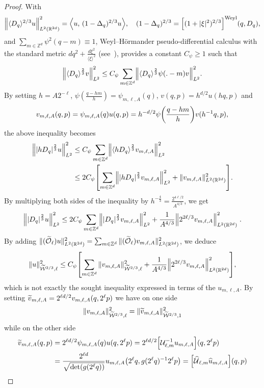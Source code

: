 \documentclass[AHL,Unicode,longabstracts]{cedram}
\newcommand{\Z}{\mathbb{Z}}
\newcommand{\R}{\mathbb{R}}
\newcommand{\clW}{\mathcal{W}}
\newcommand{\clO}{\mathcal{O}}
\newcommand{\clU}{\mathcal{U}}
\newcommand\norm[1]{\left\lVert#1\right\rVert}
\let\oldtilde\tilde
\renewcommand*{\tilde}[1]{\mathchoice{\widetilde{#1}}{\widetilde{#1}}{\oldtilde{#1}}{\oldtilde{#1}}}
\let\oldhat\hat
\renewcommand*{\hat}[1]{\mathchoice{\widehat{#1}}{\widehat{#1}}{\oldhat{#1}}{\oldhat{#1}}}
\let\originalleft\left
\let\originalright\right
\renewcommand{\left}{\mathopen{}\mathclose\bgroup\originalleft}
\renewcommand{\right}{\aftergroup\egroup\originalright}
\begin{document}
\begin{proof}
With
\[
\norm{\langle D_q\rangle^{2/3}u}_{L^2(\R^{2d})}^2=\left\langle u,\, (1-\Delta_q)^{2/3} u\right\rangle,\quad (1-\Delta_q)^{2/3}=\left[(1+|\xi|^2)^{2/3}\right]^{\text{Weyl}}(q,D_q),
\]
and $\sum_{m\in \Z^{d}} \psi^2(q-m)\equiv 1$, Weyl--H\"ormander pseudo-differential calculus with the standard metric $dq^2+\frac{d\xi^2}{\langle\xi\rangle^2}$ (see~\cite[Chapter~XVIII]{HormIII}), provides a constant $C_{\psi}\geq 1$ such that
\[
\left\| \langle D_q \rangle^{\frac{2}{3}} v \right\|_{L^2}^2 \leq C_{\psi}\sum_{m\in \Z^d}\left\| \langle D_q \rangle^{\frac{2}{3}} \psi(.-m) v \right\|_{L^2}^2 .
\]
By setting $h=A2^{-\ell}$, $\psi(\frac{q-hm}{h}) = \psi_{m,\ell,A }(q)$,
$v(q,p)=h^{d/2}u(hq,p)$ and
\[
v_{m,\ell,A}(q,p)=\psi_{m,\ell,A}(q)u(q,p)=h^{-d/2}\psi\left(\frac{q-hm}{h}\right)v(h^{-1}q,p),
\]
the above inequality becomes
\begin{align*}
\left\| |hD_q|^{\frac{2}{3}} u \right\|_{L^2}^2 &\leq C_{\psi}\sum_{m\in \Z^d}\left\| \langle hD_q \rangle^{\frac{2}{3}} v_{m,\ell,A}\right\|_{L^2}^2
\\
&\leq 2 C_{\psi}\left[\sum_{m\in \Z^d}\left\| |hD_q|^{\frac{2}{3}} v_{m,\ell,A} \right\|_{L^2}^2+\|v_{m,\ell, A}\|_{L^2(\R^{2d})}^2\right].
\end{align*}
By multiplying both sides of the inequality by $ h^{-\frac{4}{3}}=\frac{2^{4\ell/2}}{A^{4/3}}$, we get
\[
\left\| |D_q|^{\frac{2}{3}} u \right\|_{L^2}^2 \leq 2C_{\psi}\sum_{m\in \Z^d}\left\| |D_q|^{\frac{2}{3}} v_{m,\ell,A}\right\|_{L^2}^2 +\frac{1}{A^{4/3}}\left\|2^{2\ell/3}v_{m,\ell, A}\right\|_{L^2(\R^{2d})}^2\;.
\]
By adding $\|(\tilde{\clO}_{\ell})u\|_{L^2(\R^{2d})}^{2}=\sum_{m\in\Z^d} \|(\tilde{\clO}_{\ell})v_{m,\ell,A}\|_{L^2(\R^{2d})}^{2}$, we deduce
\[
\|u\|_{\widetilde{\clW}^{2/3},\ell}^2\leq C_{\psi}\left[\sum_{m\in\Z^d} \|v_{m,\ell,A}\|_{\widetilde{\clW}^{2/3},\ell}^2 +\frac{1}{A^{4/3}}\left\|2^{2\ell/3}v_{m,\ell, A}\right\|_{L^2(\R^{2d})}^2\right],
\]
which is not exactly the sought inequality expressed in terms of the $u_{m,\ell,A}$. By setting $\tilde{v}_{m,\ell,A}=2^{\ell d/2}v_{m,\ell,A}(q, 2^{\ell}p)$ we have on one side
\[
\|v_{m,\ell,A}\|_{\widetilde{\clW}^{2/3},\ell}^2= \|\tilde{v}_{m,\ell,A}\|_{\widetilde{\clW}^{2/3},1}^2
\]
while on the other side
\begin{align*}
\tilde{v}_{m,\ell, A}(q,p)&=2^{\ell d/2}\psi_{m,\ell,A}(q) u(q,2^{\ell}p)=2^{\ell d/2}\left[\clU_{\ell,m}^{-1}u_{m,\ell,A}\right](q, 2^{\ell}p)\\
&=
\frac{2^{\ell d}}{\sqrt{\det (g(2^{\ell}q))}} u_{m,\ell,A}\left(2^{\ell}q,g(2^{\ell}q)^{-1}2^{\ell}p\right) =\left[\hat{\clU}_{\ell,m}\hat{u}_{m,\ell,A}\right](q,p)

\end{align*}
\end{proof}
\end{document}
